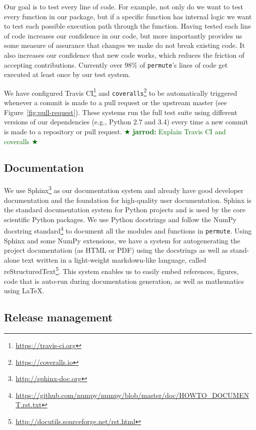 \documentclass[]{article}
\newcommand{\jarrod}[1] { \textcolor{darkgreen} {
\ensuremath{\bigstar} {\bf jarrod:}  {#1}
\ensuremath{\bigstar} } }
\begin{document}
Our goal is to test every line of code.
For example, not only do we want to test every function in our package, but if
a specific function has internal logic we want to test each possible execution
path through the function.
Having tested each line of code increases our confidence in our code, but
more importantly provides us some measure of assurance that changes we make do
not break existing code.
It also increases our confidence that new code works, which reduces the
friction of accepting contributions.
Currently over 98\% of \texttt{permute}'s lines of code get executed at least
once by our test system.

We have configured Travis CI\footnote{
  \url{https://travis-ci.org}
} 
and
\texttt{coveralls}\footnote{
  \url{https://coveralls.io}
}
to be automatically
triggered whenever a commit is made to a pull request or the upstream master
(see Figure~\ref{fig:pull-request}).
These systems run the full test suite using different versions of our
dependencies (e.g., Python 2.7 and 3.4) every time a new commit is made to a
repository or pull request.
\jarrod{Explain Travis CI and coveralls}

\subsection{\label{sec:doc}Documentation}

We use Sphinx\footnote{
   \url{http://sphinx-doc.org}
} 
as our documentation system
and already have good developer documentation and the foundation for
high-quality user documentation.
Sphinx is the standard documentation system for Python projects and is used by
the core scientific Python packages.
We use Python docstrings and follow the NumPy docstring
standard\footnote{
   \url{https://github.com/numpy/numpy/blob/master/doc/HOWTO\_DOCUMENT.rst.txt}
}
to document all the modules and functions in \texttt{permute}.
Using Sphinx and some NumPy extensions, we have a system for autogenerating the
project documentation (as HTML or PDF) using the docstrings as well as
stand-alone text written in a light-weight markdown-like language, called
reStructuredText\footnote{\url{http://docutils.sourceforge.net/rst.html}}.
This system enables us to easily embed references, figures, code that is
auto-run during documentation generation, as well as mathematics using \LaTeX.

\subsection{\label{sec:release}Release management}
\end{document}
